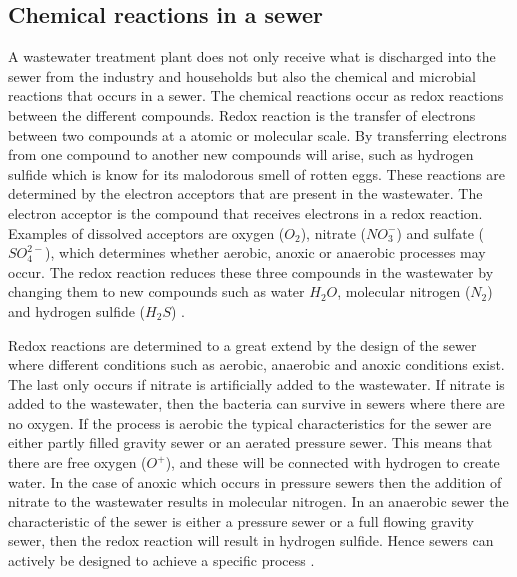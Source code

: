\subsection{Chemical reactions in a sewer}\label{subse:chemical_reactions_in_a_sewer}
A wastewater treatment plant does not only receive what is discharged into the sewer from the industry and households but also the chemical and microbial reactions that occurs in a sewer. The chemical reactions occur as redox reactions between the different compounds. Redox reaction is the transfer of electrons between two compounds at a atomic or molecular scale. By transferring electrons from one compound to another new compounds will arise, such as hydrogen sulfide which is know for its malodorous smell of rotten eggs. These reactions are determined by the electron acceptors that are present in the wastewater. The electron acceptor is the compound that receives electrons in a redox reaction. Examples of dissolved acceptors are oxygen ($O_2$), nitrate ($NO^-_3$) and sulfate ($SO^{2-}_4$), which determines whether aerobic, anoxic or anaerobic processes may occur. The redox reaction reduces these three compounds in the wastewater by changing them to new compounds such as water $H_2O$, molecular nitrogen ($N_2$) and hydrogen sulfide ($H_2S$) \cite{Sewer_processes}. 

Redox reactions are determined to a great extend by the design of the sewer where different conditions such as aerobic, anaerobic and anoxic conditions exist. The last only occurs if nitrate is artificially added to the wastewater. If nitrate is added to the wastewater, then the bacteria can survive in sewers where there are no oxygen. If the process is aerobic the typical characteristics for the sewer are either partly filled gravity sewer or an aerated pressure sewer. This means that there are free oxygen ($O^+$), and these will be connected with hydrogen to create water. In the case of anoxic which occurs in pressure sewers then the addition of nitrate to the wastewater results in molecular nitrogen. In an anaerobic sewer the characteristic of the sewer is either a pressure sewer or a full flowing gravity sewer, then the redox reaction will result in hydrogen sulfide. Hence sewers can actively be designed to achieve a specific process \cite{Sewer_processes}. 



